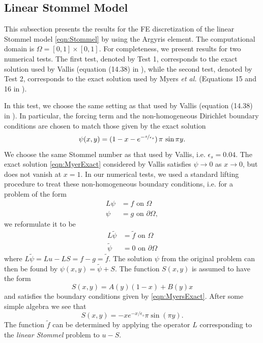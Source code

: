 \subsection{Linear Stommel Model} \label{sse:LSM} This subsection presents the
results for the FE discretization of the linear Stommel model
\eqref{eqn:Stommel} by using the Argyris element. The computational domain is
$\Omega = [0,1]\times [0,1]$. For completeness, we present results for two
numerical tests. The first test, denoted by Test 1, corresponds to the exact
solution used by Vallis (equation (14.38) in \cite{Vallis06}), while the second
test, denoted by Test 2, corresponds to the exact solution used by Myers
\emph{et al.} (Equations 15 and 16 in \cite{Myers}).

 In this test, we choose the same setting as that used by Vallis
(equation (14.38) in \cite{Vallis06}).  In particular, the forcing term and the
non-homogeneous Dirichlet boundary conditions are chosen to match those given by
the exact solution
\begin{equation}
  \psi(x,y) = (1-x-e^{-\nicefrac{x}{\epsilon_s}})\, \pi\, \sin \pi y.
  \label{eqn:MyerExact}
\end{equation}
We choose the same Stommel number as that used by Vallis, i.e.
$\epsilon_s=0.04$. The exact solution \eqref{eqn:MyerExact} considered by Vallis
satisfies $\psi \to 0$ as $x \to 0$, but does not vanish at $x=1$. In our
numerical tests, we used a standard lifting procedure to treat these
non-homogeneous boundary conditions, i.e. for a problem of the form
\begin{align*}
  L \psi&=f \text{ on } \Omega\\
  \psi &=g \text{ on } \partial \Omega,
\end{align*}
we reformulate it to be
\begin{align*}
  L\tilde{\psi} &= \tilde{f} \text{ on } \Omega \\
  \tilde{\psi} &= 0 \text{ on } \partial \Omega
\end{align*}
where $L\tilde{\psi} = Lu - LS = f - g = \tilde{f}$. The solution $\psi$ from
the original problem can then be found by $\psi(x,y) =\tilde{\psi}+S$. The
function $S(x,y)$ is assumed to have the form
\begin{equation*}
  S(x,y) = A(y) (1-x) + B(y) x
\end{equation*}
and satisfies the boundary conditions given by \eqref{eqn:MyersExact}. After
some simple algebra we see that
\begin{equation*}
  S(x,y) = -x e^{-x/\epsilon_s}\pi \sin(\pi y).
\end{equation*}
The function $\tilde{f}$ can be determined by applying the operator $L$
corresponding to the \emph{linear Stommel} problem to $u - S$.

